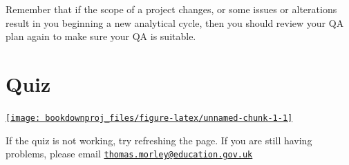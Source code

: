 \documentclass[
]{article}
\begin{document}
Remember that if the scope of a project changes, or some issues or alterations result in you beginning a new analytical cycle, then you should review your QA plan again to make sure your QA is suitable.

\hypertarget{quiz}{%
\section{Quiz}\label{quiz}}

\href{https://rsconnect/rsc/content/197}{\texttt{[image: bookdownproj\_files/figure-latex/unnamed-chunk-1-1]} }

If the quiz is not working, try refreshing the page. If you are still having problems, please email \href{mailto:thomas.morley@education.gov.uk}{\nolinkurl{thomas.morley@education.gov.uk}}
\end{document}
